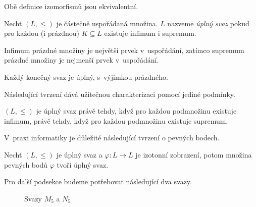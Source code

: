 \begin{claim}
    Obě definice izomorfismů jsou ekvivalentní.
\end{claim}

\begin{definition}
    Nechť $(L, \leq)$ je částečně uspořádaná množina.
    $L$ nazveme {\em úplný svaz} pokud pro každou (i prázdnou)
    $K \subseteq L$ existuje infimum i supremum.
\end{definition}

Infimum prázdné množiny je největší prvek v~uspořádání,
zatímco supremum prázdné množiny je nejmenší prvek v~uspořádání.

\begin{note}
    Každý konečný svaz je úplný, s~výjimkou prázdného.
\end{note}

Následující tvrzení dává užitečnou charakterizaci pomocí jediné
podmínky.

\begin{claim}
    $(L, \leq)$ je úplný svaz právě tehdy, když pro každou podmnožinu
    existuje infimum, právě tehdy, když pro každou podmnožinu existuje
    supremum.
\end{claim}

V~praxi informatiky je důležité následující tvrzení o pevných bodech.

\begin{claim}
    Nechť $(L, \leq)$ je úplný svaz a $\varphi : L \to L$ je izotonní
    zobrazení,
    potom množina pevných bodů $\varphi$ tvoří úplný svaz.
\end{claim}

\pagebreak

Pro další podsekce budeme potřebovat následující dva svazy.

\begin{figure}[h!]
\centering
{}
\hspace{10pt}
\caption{Svazy $M_5$ a $N_5$}
\end{figure}

